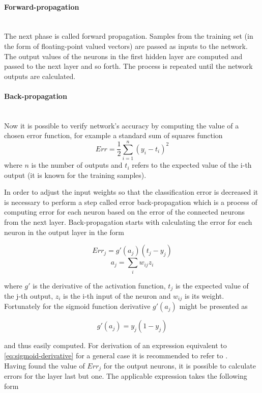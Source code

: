\documentclass[11pt,oneside, a4paper]{report}
\begin{document}
\paragraph{Forward-propagation}\mbox{}\\
The next phase is called forward propagation. Samples from the training set (in the form of floating-point valued vectors) are passed as inputs to the network. The output values of the neurons in the first hidden layer are computed and passed to the next layer and so forth. The process is repeated until the network outputs are calculated.

\paragraph{Back-propagation}\mbox{}\\
Now it is possible to verify network's accuracy by computing the value of a chosen error function, for example a standard sum of squares function
\begin{equation}
Err = \frac{1}{2}\sum_{i=1}^{n}(y_i - t_i)^2
\end{equation}
where $n$ is the number of outputs and $t_i$ refers to the expected value of the i-th output (it is known for the training samples).

In order to adjust the input weights so that the classification error is decreased it is necessary to perform a step called error back-propagation which is a process of computing error for each neuron based on the error of the connected neurons from the next layer. Back-propagation starts with calculating the error for each neuron in the output layer in the form

\begin{equation}
Err_j = g'(a_j) (t_j - y_j)
\end{equation}
\begin{equation}
a_j=\sum_{i} w_{ij} z_i
\end{equation}

where $g'$ is the derivative of the activation function, $t_j$ is the expected value of the j-th output, $z_i$ is the i-th input of the neuron and $w_{ij}$ is its weight. Fortunately for the sigmoid function derivative $g'(a_j)$ might be presented as

\begin{equation} \label{eq:sigmoid-derivative}
g'(a_j) = y_j (1 - y_j)
\end{equation}

and thus easily computed. For derivation of an expression equivalent to \ref{eq:sigmoid-derivative} for a general case it is recommended to refer to \cite{BISHOP1995}.
\\
Having found the value of $Err_j$ for the output neurons, it is possible to calculate errors for the layer last but one. The applicable expression takes the following form
\end{document}
